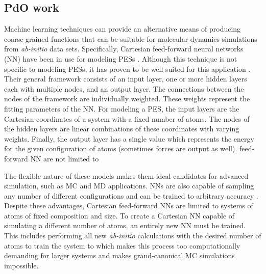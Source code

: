 \documentclass[12pt]{cmuthesis}
\begin{document}
\subsection{PdO work}
\label{sec:org0dda5f2}
Machine learning techniques can provide an alternative means of producing coarse-grained functions that can be suitable for molecular dynamics simulations from \emph{ab-initio} data sets. Specifically, Cartesian feed-forward neural networks (NN) have been in use for modeling PESs \cite{witkoskie-2005-neural-networ,behler-2007-repres-molec}. Although this technique is not specific to modeling PESs, it has proven to be well suited for this application \cite{blank-1995-neural-networ}. Their general framework consists of an input layer, one or more hidden layers each with multiple nodes, and an output layer. The connections between the nodes of the framework are individually weighted. These weights represent the fitting parameters of the NN. For modeling a PES, the input layers are the Cartesian-coordinates of a system with a fixed number of atoms. The nodes of the hidden layers are linear combinations of these coordinates with varying weights. Finally, the output layer has a single value which represents the energy for the given configuration of atoms (sometimes forces are output as well). feed-forward NN are not limited to

The flexible nature of these models makes them ideal candidates for advanced simulation, such as MC and MD applications. NNs are also capable of sampling any number of different configurations and can be trained to arbitrary accuracy \cite{hornik-1989-multil}. Despite these advantages, Cartesian feed-forward NNs are limited to systems of atoms of fixed composition and size. To create a Cartesian NN capable of simulating a different number of atoms, an entirely new NN must be trained. This includes performing all new \emph{ab-initio} calculations with the desired number of atoms to train the system to which makes this process too computationally demanding for larger systems and makes grand-canonical MC simulations impossible.
\end{document}
